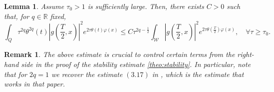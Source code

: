 \documentclass{amsart}
\numberwithin{equation}{section}
\newtheorem{lemma}[theorem]{Lemma}
\newtheorem{remark}[theorem]{Remark}
\begin{document}
\begin{lemma}\label{Appendix-Lema1}
Assume $\tau_0>1$ is sufficiently large. Then, there exists $C>0$ such that, for $q\in\mathbb{R}$ fixed,    \begin{equation}\label{ine:varphi:T/2}
        \int_{Q}\tau^{2q}\theta^{2q}(t)\left|g\left(\frac{T}{2},x\right)\right|^2e^{2\tau\theta(t)\varphi(x)}\le C\tau^{2q-\frac{1}{2}}\int_{\mathcal{W}} \left|g\left(\frac{T}{2},x\right)\right|^2e^{2\tau\theta\left(\frac{T}{2}\right)\varphi(x)},\quad \forall\tau\geq \tau_0.
        \end{equation}
\end{lemma}
\begin{remark}
    The above estimate is crucial to control certain terms from the right-hand side in the proof of the stability estimate \eqref{theo:stability}. In particular, note that for $2q=1$ we recover the estimate $(3.17)$ in \cite{IY-1998}, which is the estimate that works in that paper.
\end{remark}
\end{document}
